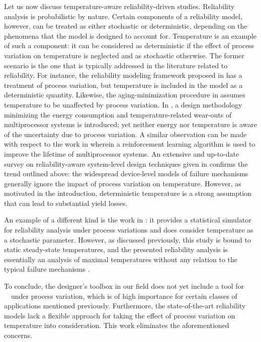 Let us now discuss temperature-aware reliability-driven studies.
Reliability analysis is probabilistic by nature.
Certain components of a reliability model, however, can be treated as either stochastic or deterministic, depending on the phenomena that the model is designed to account for.
Temperature is an example of such a component: it can be considered as deterministic if the effect of process variation on temperature is neglected and as stochastic otherwise.
The former scenario is the one that is typically addressed in the literature related to reliability.
For instance, the reliability modeling framework proposed in \cite{xiang2010} has a treatment of process variation, but temperature is included in the model as a deterministic quantity.
Likewise, the aging-minimization procedure in \cite{ukhov2012} assumes temperature to be unaffected by process variation.
In \cite{das2014a}, a design methodology minimizing the energy consumption and temperature-related wear-outs of multiprocessor systems is introduced; yet neither energy nor temperature is aware of the uncertainty due to process variation.
A similar observation can be made with respect to the work in \cite{das2014c} wherein a reinforcement learning algorithm is used to improve the lifetime of multiprocessor systems.
An extensive and up-to-date survey on reliability-aware system-level design techniques given in \cite{das2014b} confirms the trend outlined above: the widespread device-level models of failure mechanisms generally ignore the impact of process variation on temperature.
However, as motivated in the introduction, deterministic temperature is a strong assumption that can lead to substantial yield losses.

An example of a different kind is the work in \cite{lee2013}: it provides a statistical simulator for reliability analysis under process variations and does consider temperature as a stochastic parameter.
However, as discussed previously, this study is bound to static steady-state temperatures, and the presented reliability analysis is essentially an analysis of maximal temperatures without any relation to the typical failure mechanisms \cite{jedec}.

To conclude, the designer's toolbox in our field does not yet include a tool for \DSS\ \ta\ under process variation, which is of high importance for certain classes of applications mentioned previously.
Furthermore, the state-of-the-art reliability models lack a flexible approach for taking the effect of process variation on temperature into consideration.
This work eliminates the aforementioned concerns.
